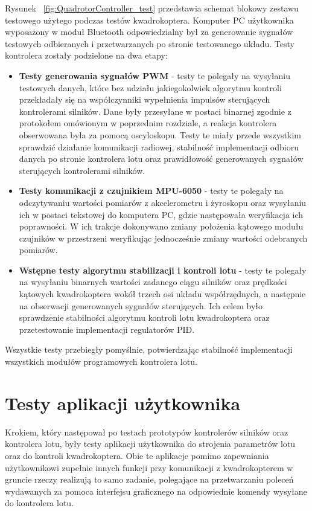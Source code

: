 Rysunek ~\ref{fig:QuadrotorController_test} przedstawia schemat blokowy zestawu testowego użytego podczas testów kwadrokoptera. Komputer PC użytkownika wyposażony w moduł Bluetooth odpowiedzialny był za generowanie sygnałów testowych odbieranych i przetwarzanych po stronie testowanego układu. Testy kontrolera zostały podzielone na dwa etapy:
\begin{itemize}
	\item \textbf{Testy generowania sygnałów PWM} - testy te polegały na wysyłaniu testowych danych, które bez udziału jakiegokolwiek algorytmu kontroli przekładały się na współczynniki wypełnienia impulsów sterujących kontrolerami silników. Dane były przesyłane w postaci binarnej zgodnie z protokołem omówionym w poprzednim rozdziale, a reakcja kontrolera obserwowana była za pomocą oscyloskopu. Testy te miały przede wszystkim sprawdzić działanie komunikacji radiowej, stabilność implementacji odbioru danych po stronie kontrolera lotu oraz prawidłowość generowanych sygnałów sterujących kontrolerami silników.
	\item \textbf{Testy komunikacji z czujnikiem MPU-6050} - testy te polegały na odczytywaniu wartości pomiarów z akcelerometru i żyroskopu oraz wysyłaniu ich w postaci tekstowej do komputera PC, gdzie następowała weryfikacja ich poprawności. W ich trakcje dokonywano zmiany położenia kątowego modułu czujników w przestrzeni weryfikując jednocześnie zmiany wartości odebranych pomiarów.  
	\item \textbf{Wstępne testy algorytmu stabilizacji i kontroli lotu} - testy te polegały na wysyłaniu binarnych wartości zadanego ciągu silników oraz prędkości kątowych kwadrokoptera wokół trzech osi układu współrzędnych, a następnie na obserwacji generowanych sygnałów sterujących. Ich celem było sprawdzenie stabilności algorytmu kontroli lotu kwadrokoptera oraz przetestowanie implementacji regulatorów PID.   
\end{itemize}

Wszystkie testy przebiegły pomyślnie, potwierdzając stabilność implementacji wszystkich modułów programowych kontrolera lotu.

\section{Testy aplikacji użytkownika}

Krokiem, który następował po testach prototypów kontrolerów silników oraz kontrolera lotu, były testy aplikacji użytkownika do strojenia parametrów lotu oraz do kontroli kwadrokoptera. Obie te aplikacje pomimo zapewniania użytkownikowi zupełnie innych funkcji przy komunikacji z kwadrokopterem w gruncie rzeczy realizują to samo zadanie, polegające na przetwarzaniu poleceń wydawanych za pomoca interfejsu graficznego na odpowiednie komendy wysyłane do kontrolera lotu. 

